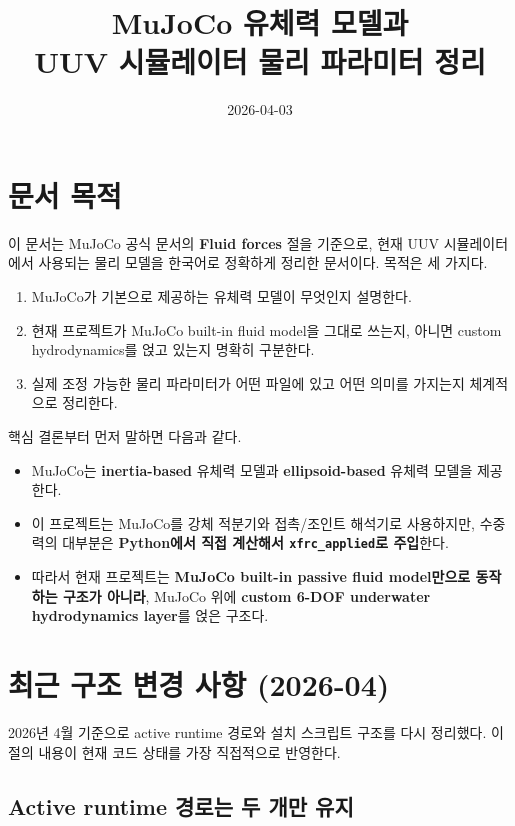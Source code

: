 \documentclass[11pt,a4paper]{article}
\title{MuJoCo 유체력 모델과\\UUV 시뮬레이터 물리 파라미터 정리}
\author{}
\date{2026-04-03}
\begin{document}
\maketitle

\section{문서 목적}

이 문서는 MuJoCo 공식 문서의 \textbf{Fluid forces} 절을 기준으로, 현재 UUV 시뮬레이터에서 사용되는 물리 모델을 한국어로 정확하게 정리한 문서이다. 목적은 세 가지다.

\begin{enumerate}[leftmargin=2em]
  \item MuJoCo가 기본으로 제공하는 유체력 모델이 무엇인지 설명한다.
  \item 현재 프로젝트가 MuJoCo built-in fluid model을 그대로 쓰는지, 아니면 custom hydrodynamics를 얹고 있는지 명확히 구분한다.
  \item 실제 조정 가능한 물리 파라미터가 어떤 파일에 있고 어떤 의미를 가지는지 체계적으로 정리한다.
\end{enumerate}

핵심 결론부터 먼저 말하면 다음과 같다.

\begin{itemize}[leftmargin=2em]
  \item MuJoCo는 \textbf{inertia-based} 유체력 모델과 \textbf{ellipsoid-based} 유체력 모델을 제공한다.
  \item 이 프로젝트는 MuJoCo를 강체 적분기와 접촉/조인트 해석기로 사용하지만, 수중력의 대부분은 \textbf{Python에서 직접 계산해서 \texttt{xfrc\_applied}로 주입}한다.
  \item 따라서 현재 프로젝트는 \textbf{MuJoCo built-in passive fluid model만으로 동작하는 구조가 아니라}, MuJoCo 위에 \textbf{custom 6-DOF underwater hydrodynamics layer}를 얹은 구조다.
\end{itemize}

\section{최근 구조 변경 사항 (2026-04)}

2026년 4월 기준으로 active runtime 경로와 설치 스크립트 구조를 다시 정리했다. 이 절의 내용이 현재 코드 상태를 가장 직접적으로 반영한다.

\subsection{Active runtime 경로는 두 개만 유지}
\end{document}
